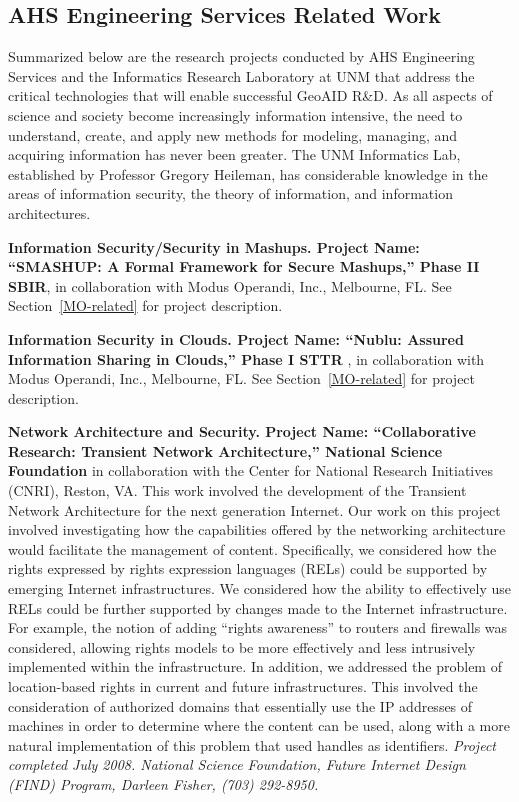 \documentclass{sbir}
\begin{document}
\subsection{AHS Engineering Services Related Work}
Summarized below are the research projects conducted by AHS Engineering Services and the Informatics Research Laboratory at UNM that address the critical technologies that will enable successful GeoAID R\&D. As all aspects of science and society become increasingly information intensive, the need to understand, create, and apply new methods for modeling, managing, and acquiring information has never been greater. The UNM Informatics Lab, established by Professor Gregory Heileman, has considerable knowledge in the areas of information security, the theory of information, and information architectures.

{\bf Information Security/Security in Mashups. Project Name: ``SMASHUP: A Formal Framework for Secure Mashups,'' Phase II SBIR}, in collaboration with Modus Operandi, Inc., Melbourne, FL. See Section~\ref{MO-related} for project description.

{\bf Information Security in Clouds. Project Name: ``Nublu: Assured Information Sharing in Clouds,'' Phase I STTR} , in collaboration with Modus Operandi, Inc., Melbourne, FL. See Section~\ref{MO-related} for project description.

{\bf Network Architecture and Security. Project Name: ``Collaborative Research: Transient Network Architecture,'' National Science Foundation} in collaboration with the Center for National Research Initiatives (CNRI), Reston, VA. This work involved the development of the Transient Network Architecture for the next generation Internet. Our work on this project involved investigating how the capabilities offered by the networking architecture would facilitate the management of content. Specifically, we considered how the rights expressed by rights expression languages (RELs) could be supported by emerging Internet infrastructures. We considered how the ability to effectively use RELs could be further supported by changes made to the Internet infrastructure. For example, the notion of adding ``rights awareness'' to routers and firewalls was considered, allowing rights models to be more effectively and less intrusively implemented within the infrastructure. In addition, we addressed the problem of location-based rights in current and future infrastructures. This involved the consideration of authorized domains that essentially use the IP addresses of machines in order to determine where the content can be used, along with a more natural implementation of this problem that used handles as identifiers. \emph{Project completed July 2008. National Science Foundation, Future Internet Design (FIND) Program, Darleen Fisher, (703) 292-8950.}
\end{document}

